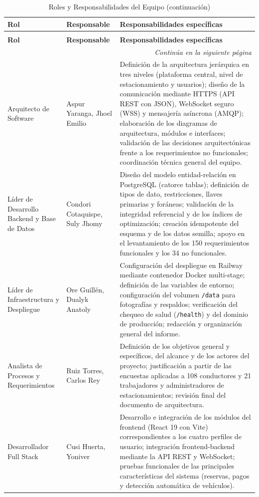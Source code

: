 \begin{longtable}{p{3.2cm} p{3.2cm} p{8cm}}
\caption{Roles y Responsabilidades del Equipo} \\
\toprule
\textbf{Rol} & \textbf{Responsable} & \textbf{Responsabilidades específicas} \\
\midrule
\endfirsthead

\caption[]{Roles y Responsabilidades del Equipo (continuación)} \\
\toprule
\textbf{Rol} & \textbf{Responsable} & \textbf{Responsabilidades específicas} \\
\midrule
\endhead

\midrule
\multicolumn{3}{r}{\footnotesize\textit{Continúa en la siguiente página}} \\
\endfoot

\bottomrule
\endlastfoot

Arquitecto de Software & Aspur Yaranga, Jhoel Emilio & Definición de la arquitectura jerárquica en tres niveles (plataforma central, nivel de estacionamiento y usuarios); diseño de la comunicación mediante HTTPS (API REST con JSON), WebSocket seguro (WSS) y mensajería asíncrona (AMQP); elaboración de los diagramas de arquitectura, módulos e interfaces; validación de las decisiones arquitectónicas frente a los requerimientos no funcionales; coordinación técnica general del equipo. \\
\midrule
Líder de Desarrollo Backend y Base de Datos & Condori Cotaquispe, Suly Jhomy & Diseño del modelo entidad-relación en PostgreSQL (catorce tablas); definición de tipos de dato, restricciones, llaves primarias y foráneas; validación de la integridad referencial y de los índices de optimización; creación idempotente del esquema y de los datos semilla; apoyo en el levantamiento de los 150 requerimientos funcionales y los 34 no funcionales. \\
\midrule
Líder de Infraestructura y Despliegue & Ore Guillén, Dualyk Anatoly & Configuración del despliegue en Railway mediante contenedor Docker multi-stage; definición de las variables de entorno; configuración del volumen \texttt{/data} para fotografías y respaldos; verificación del chequeo de salud (\texttt{/health}) y del dominio de producción; redacción y organización general del informe. \\
\midrule
Analista de Procesos y Requerimientos & Ruiz Torres, Carlos Rey & Definición de los objetivos general y específicos, del alcance y de los actores del proyecto; justificación a partir de las encuestas aplicadas a 108 conductores y 21 trabajadores y administradores de estacionamientos; revisión final del documento de arquitectura. \\
\midrule
Desarrollador Full Stack & Cusi Huerta, Yoniver & Desarrollo e integración de los módulos del frontend (React 19 con Vite) correspondientes a los cuatro perfiles de usuario; integración frontend-backend mediante la API REST y WebSocket; pruebas funcionales de las principales características del sistema (reservas, pagos y detección automática de vehículos). \\
\end{longtable}

